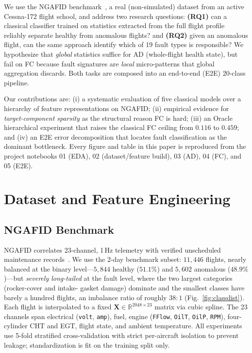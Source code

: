 \documentclass[conference]{IEEEtran}
\begin{document}
We use the NGAFID benchmark~\cite{ngafid2021}, a real (non-simulated) dataset
from an active Cessna-172 flight school, and address two research questions:
\textbf{(RQ1)} can a classical classifier trained on statistics extracted from
the full flight profile reliably separate healthy from anomalous flights? and
\textbf{(RQ2)} given an anomalous flight, can the same approach identify which of
19 fault types is responsible? We hypothesize that \emph{global} statistics
suffice for AD (whole-flight health state), but fail on FC because fault
signatures are \emph{local} micro-patterns that global aggregation discards. Both
tasks are composed into an end-to-end (E2E) 20-class pipeline.

Our contributions are: (i) a systematic evaluation of five classical models over
a hierarchy of feature representations on NGAFID; (ii) empirical evidence for
\emph{target-component sparsity} as the structural reason FC is hard; (iii) an
Oracle hierarchical experiment that raises the classical FC ceiling from $0.116$
to $0.459$; and (iv) an E2E error decomposition that locates fault classification
as the dominant bottleneck. Every figure and table in this paper is reproduced
from the project notebooks 01 (EDA), 02 (dataset/feature build), 03 (AD), 04 (FC),
and 05 (E2E).

\section{Dataset and Feature Engineering}
\label{sec:data}

\subsection{NGAFID Benchmark}
NGAFID correlates 23-channel, 1\,Hz telemetry with verified unscheduled
maintenance records~\cite{ngafid2021}. We use the 2-day benchmark subset:
$11{,}446$ flights, nearly balanced at the binary level---$5{,}844$ healthy
($51.1\%$) and $5{,}602$ anomalous ($48.9\%$)---but \emph{severely long-tailed}
at the fault level, where the two largest categories (rocker-cover and intake-
gasket damage) dominate and the smallest classes have barely a hundred flights,
an imbalance ratio of roughly $38{:}1$ (Fig.~\ref{fig:classdist}). Each flight is
interpolated to a fixed $\mathbf{X}\in\mathbb{R}^{2048\times 23}$ matrix via cubic
spline. The 23 channels span electrical (\texttt{volt}, \texttt{amp}), fuel,
engine (\texttt{FFlow}, \texttt{OilT}, \texttt{OilP}, \texttt{RPM}), four-cylinder
CHT and EGT, flight state, and ambient temperature. All experiments use 5-fold
stratified cross-validation with strict per-aircraft isolation to prevent
leakage; standardization is fit on the training split only.
\end{document}
